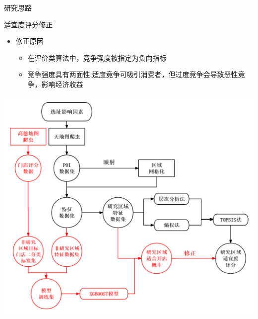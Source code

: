\documentclass{beamer}
\begin{document}
\begin{frame}{研究思路}   
    \begin{minipage}{0.37\textwidth}
        适宜度评分修正
        \begin{itemize}
            \item 修正原因
            \begin{itemize}
                \item 在评价类算法中，竞争强度被指定为负向指标
                \item 竞争强度具有两面性,适度竞争可吸引消费者，但过度竞争会导致恶性竞争，影响经济收益
    
            \end{itemize}
        \end{itemize}
  
      \end{minipage}
      \hfill
      \begin{minipage}{0.6\textwidth}
        \includegraphics[width=1\textwidth]{pic/5.png}
      \end{minipage}
\end{frame}
\end{document}
